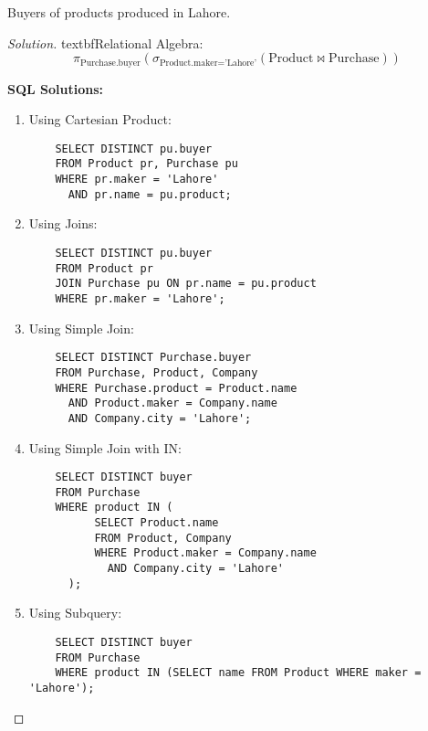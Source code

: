 \documentclass[10pt]{article}
\newenvironment{problem}[2][Problem]{\begin{trivlist}
\item[\hskip \labelsep {\bfseries #1}\hskip \labelsep {\bfseries #2.}]}{\end{trivlist}}
\begin{document}
\begin{problem}{5}
Buyers of products produced in Lahore. 
\end{problem}

\begin{proof}[Solution]
textbf{Relational Algebra:}
\[
\pi_{\text{Purchase.buyer}}\left(\sigma_{\text{Product.maker} = \text{'Lahore'}}\left(\text{Product} \bowtie \text{Purchase}\right)\right)
\]

\textbf{SQL Solutions:}
\begin{enumerate}
    \item Using Cartesian Product:
    \begin{verbatim}
    SELECT DISTINCT pu.buyer
    FROM Product pr, Purchase pu
    WHERE pr.maker = 'Lahore'
      AND pr.name = pu.product;
    \end{verbatim}
    
    \item Using Joins:
    \begin{verbatim}
    SELECT DISTINCT pu.buyer
    FROM Product pr
    JOIN Purchase pu ON pr.name = pu.product
    WHERE pr.maker = 'Lahore';
    \end{verbatim}
    \item Using Simple Join:
    \begin{verbatim}
    SELECT DISTINCT Purchase.buyer
    FROM Purchase, Product, Company
    WHERE Purchase.product = Product.name
      AND Product.maker = Company.name
      AND Company.city = 'Lahore';
    \end{verbatim}
    
    \item Using Simple Join with IN:
    \begin{verbatim}
    SELECT DISTINCT buyer
    FROM Purchase
    WHERE product IN (
          SELECT Product.name
          FROM Product, Company
          WHERE Product.maker = Company.name
            AND Company.city = 'Lahore'
      );
    \end{verbatim}
    
    \item Using Subquery:
    \begin{verbatim}
    SELECT DISTINCT buyer
    FROM Purchase
    WHERE product IN (SELECT name FROM Product WHERE maker = 'Lahore');
    \end{verbatim}
\end{enumerate}
\end{proof}
\end{document}
